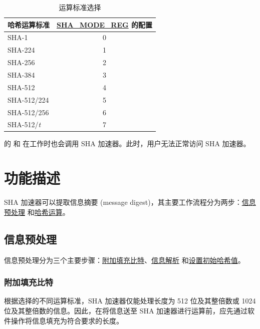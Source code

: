 \documentclass[main\_\_CN.tex]{subfiles}
\begin{document}
\begin{longtable}[c]{|l|c|}
\caption{运算标准选择}
\label{tab:sha-mode-summary}
\\\hline
\rowcolor{lightgray}
\textbf{哈希运算标准} & \textbf{\hyperref[regdesc:SHAMODEREG]{SHA\_MODE\_REG} 的配置}\\ \hline
    SHA-1               & 0 \\\hline
    SHA-224             & 1 \\\hline
    SHA-256             & 2 \\\hline
    SHA-384             & 3 \\\hline
    SHA-512             & 4 \\\hline
    SHA-512/224         & 5 \\\hline
    SHA-512/256         & 6 \\\hline
    SHA-512/{\it{t}}    & 7 \\\hline
\end{longtable}


\begin{importantlisting}
\vspace{-0.5em}

    \chipname{} 的  和  在工作时也会调用 SHA 加速器。此时，用户无法正常访问 SHA 加速器。
\end{importantlisting}

\section{功能描述}

SHA 加速器可以提取信息摘要 (message digest)，其主要工作流程分为两步：\hyperref[sec:sha-preprocessing]{信息预处理} 和\hyperref[sec:sha-hash-operation]{哈希运算}。

\subsection{信息预处理}\label{sec:sha-preprocessing}

信息预处理分为三个主要步骤：\hyperref[sec:sha-textpadding]{附加填充比特}、\hyperref[sec:sha-parsing-message]{信息解析} 和\hyperref[sec:sha-initialhash]{设置初始哈希值}。

\subsubsection{附加填充比特}\label{sec:sha-textpadding}

根据选择的不同运算标准，SHA 加速器仅能处理长度为 512 位及其整倍数或 1024 位及其整倍数的信息。因此，在将信息送至 SHA 加速器进行运算前，应先通过软件操作将信息填充为符合要求的长度。
\end{document}
